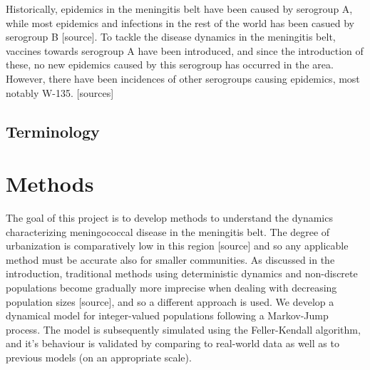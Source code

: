 \documentclass[10pt,a4paper]{article}
\begin{document}
Historically, epidemics in the meningitis belt have been caused by serogroup A, while most epidemics and infections in the rest of the world has been casued by serogroup B [source]. To tackle the disease dynamics in the meningitis belt, vaccines towards serogroup A have been introduced, and since the introduction of these, no new epidemics caused by this serogroup has occurred in the area. However, there have been incidences of other serogroups causing epidemics, most notably W-135. [sources]




\subsection{Terminology}

\section{Methods}

The goal of this project is to develop methods to understand the dynamics characterizing meningococcal disease in the meningitis belt. The degree of urbanization is comparatively low in this region [source] and so any applicable method must be accurate also for smaller communities. As discussed in the introduction, traditional methods using deterministic dynamics and non-discrete populations become gradually more imprecise when dealing with decreasing population sizes [source], and so a different approach is used. We develop a dynamical model for integer-valued populations following a Markov-Jump process. The model is subsequently simulated using the Feller-Kendall algorithm, and it's behaviour is validated by comparing to real-world data as well as to previous models (on an appropriate scale).
\end{document}
